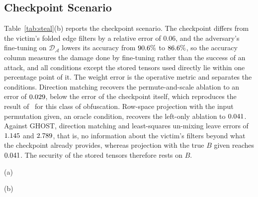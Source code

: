 \documentclass[lettersize,journal]{IEEEtran}
\begin{document}
\subsection{Checkpoint Scenario}
Table~\ref{tab:steal}(b) reports the checkpoint scenario. The checkpoint differs from the victim's folded edge filters by a relative error of $0.06$, and the adversary's fine-tuning on $\mathcal{D}_{\mathcal{A}}$ lowers its accuracy from $90.6\%$ to $86.6\%$, so the accuracy column measures the damage done by fine-tuning rather than the success of an attack, and all conditions except the stored tensors used directly lie within one percentage point of it. The weight error is the operative metric and separates the conditions. Direction matching recovers the permute-and-scale ablation to an error of $0.029$, below the error of the checkpoint itself, which reproduces the result of~\cite{wang2025arrows} for this class of obfuscation. Row-space projection with the input permutation given, an oracle condition, recovers the left-only ablation to $0.041$. Against GHOST, direction matching and least-squares un-mixing leave errors of $1.145$ and $2.789$, that is, no information about the victim's filters beyond what the checkpoint already provides, whereas projection with the true $B$ given reaches $0.041$. The security of the stored tensors therefore rests on $B$.

\begin{table}[!t]
\centering
\caption{Model stealing from device memory (ResNet-20, $n=5{,}000$): (a) proprietary scenario, (b) checkpoint scenario}
\label{tab:steal}
\begin{minipage}[t]{0.49\textwidth}\centering (a)\\[2pt]\end{minipage}\hfill
\begin{minipage}[t]{0.49\textwidth}\centering (b)\\[2pt]\end{minipage}
\end{table}
\end{document}
